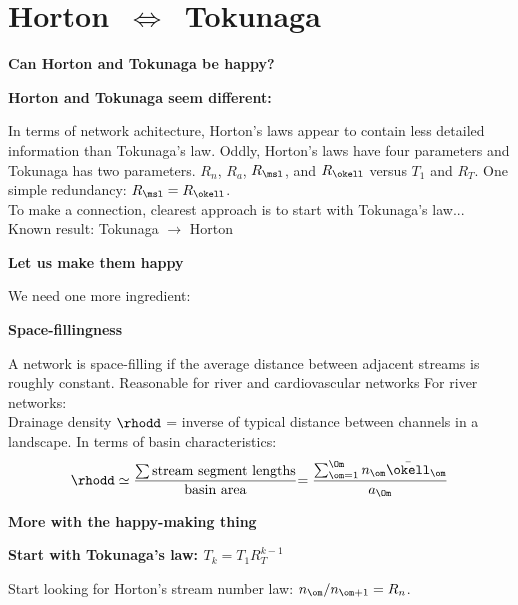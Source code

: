
\section{Horton\ \texorpdfstring{$\Leftrightarrow$}{is\ equivalent\ to}\ Tokunaga}

\begin{frame}[label=]
  \textbf{Can Horton and Tokunaga be happy?}

  \textbf{Horton and Tokunaga seem different:}
    
       In terms of network achitecture, 
        Horton's laws appear to contain less
        detailed information than Tokunaga's law.
       Oddly, Horton's laws have \alert{four} parameters
        and Tokunaga has \alert{two} parameters.
       $R_n$, $R_a$, $R_\msl$, and $R_\okell$ \alert{versus} $T_1$ and $R_T$.
        One simple redundancy: $R_\msl = R_\okell$.\\
       To make a connection, clearest approach
        is to start with Tokunaga's law...
       Known result: Tokunaga $\rightarrow$ Horton\cite{tokunaga1966a,tokunaga1978a,tokunaga1984a,peckham1995a,dodds1999a}
    
  


\begin{frame}[label=]
  \textbf{Let us make them happy}

  \alert{We need one more ingredient:}

  \textbf{Space-fillingness}
    
     A network is \alert{space-filling}
      if the average distance between adjacent streams
      is roughly constant.
     Reasonable for river and cardiovascular networks
     For river networks:\\
      \alert{Drainage density $\rhodd$} = inverse of typical distance between
      channels in a landscape.
     In terms of basin characteristics:
      $$
      \rhodd \simeq \frac{\sum \mbox{stream segment lengths}}{\mbox{basin area}}
      {= \frac{\sum_{\om=1}^{\Om} n_\om \bar{\okell}_\om} { a_\Om}}
      $$
    
  


\begin{frame}[label=]
  \textbf{More with the happy-making thing}

  \textbf{Start with Tokunaga's law: $T_k = T_1 R_T^{k-1}$}
    
     
      Start looking for Horton's stream number law: \alert{$n_{\om}/n_{\om+1} = R_n$}.
    

\end{frame}
\end{frame}
\end{frame}
